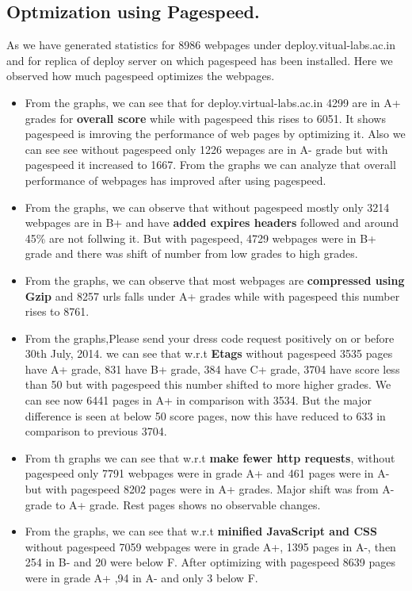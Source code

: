 \documentclass[conference]{IEEEtran}
\begin{document}
\subsection{Optmization using Pagespeed.}\label{sec-6.2}

As we have generated statistics for 8986 webpages under
deploy.vitual-labs.ac.in and for replica of deploy server on which pagespeed has
been installed. Here we observed how much pagespeed optimizes the webpages.
\begin{itemize}
\item From the graphs, we can see that for deploy.virtual-labs.ac.in 4299 are in
A+ grades for \textbf{overall score} while with pagespeed this rises to 6051. It
shows pagespeed is imroving the performance of web pages by optimizing it. Also
we can see see without pagespeed only 1226 wepages are in A- grade but with
pagespeed it increased to 1667. From the graphs we can analyze that overall
performance of webpages has improved after using pagespeed.

\item From the graphs, we can observe that without pagespeed  mostly only 3214
webpages are in B+  and have \textbf{added expires headers} followed  and around
45\% are not follwing it. But with pagespeed, 4729 webpages were in B+ grade and
there was shift of number from low grades to high grades.

\item From the graphs, we can observe that most webpages are \textbf{compressed
using Gzip} and 8257 urls falls under A+ grades while with pagespeed this number
rises to 8761.

\item From the graphs,Please send your dress code request positively on or before 30th July, 2014.
we can see that w.r.t \textbf{Etags} without pagespeed
3535 pages have A+ grade, 831 have B+ grade, 384 have C+ grade, 3704 have score
less than 50 but with pagespeed this number shifted to more higher grades. We can
see now 6441 pages in A+ in comparison with 3534. But the major difference is seen
at below 50 score pages, now this have reduced to 633 in comparison to previous
3704.

\item From th graphs we can see that w.r.t \textbf{make fewer http
requests}, without pagespeed only 7791 webpages were in grade A+ and 461 pages
were in A- but with pagespeed 8202 pages were in A+ grades. Major shift was from 
A- grade to A+ grade. Rest pages shows no observable changes.

\item From the graphs, we can see that w.r.t \textbf{minified JavaScript and CSS}
without pagespeed 7059 webpages were in grade A+, 1395 pages in A-, then 254 in
B- and 20 were below F. After optimizing with pagespeed 8639 pages were in grade A+ ,94 in A- and only 3 below F.
\end{itemize}
\end{document}
